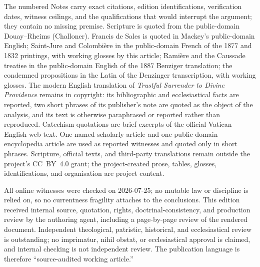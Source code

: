 The numbered Notes carry exact citations, edition identifications, verification dates, witness ceilings, and the qualifications that would interrupt the argument; they contain no missing premise. Scripture is quoted from the public-domain Douay--Rheims (Challoner). Francis de Sales is quoted in Mackey's public-domain English; Saint-Jure and Colombière in the public-domain French of the 1877 and 1832 printings, with working glosses by this article; Ramière and the Caussade treatise in the public-domain English of the 1887 Benziger translation; the condemned propositions in the Latin of the Denzinger transcription, with working glosses. The modern English translation of \emph{Trustful Surrender to Divine Providence} remains in copyright: its bibliographic and ecclesiastical facts are reported, two short phrases of its publisher's note are quoted as the object of the analysis, and its text is otherwise paraphrased or reported rather than reproduced. Catechism quotations are brief excerpts of the official Vatican English web text. One named scholarly article and one public-domain encyclopedia article are used as reported witnesses and quoted only in short phrases. Scripture, official texts, and third-party translations remain outside the project's CC~BY~4.0 grant; the project-created prose, tables, glosses, identifications, and organisation are project content.

All online witnesses were checked on 2026-07-25; no mutable law or discipline is relied on, so no currentness fragility attaches to the conclusions. This edition received internal source, quotation, rights, doctrinal-consistency, and production review by the authoring agent, including a page-by-page review of the rendered document. Independent theological, patristic, historical, and ecclesiastical review is outstanding; no imprimatur, nihil obstat, or ecclesiastical approval is claimed, and internal checking is not independent review. The publication language is therefore ``source-audited working article.''
